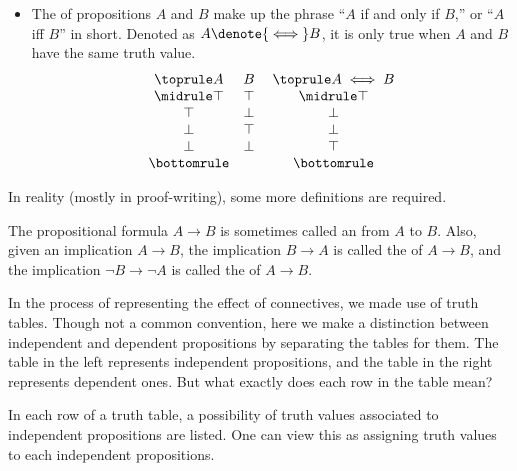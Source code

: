 \begin{itemize}
    \item The  of propositions \(A\) and \(B\)
    make up the phrase ``\(A\) if and only if \(B\),''
    or ``\(A\) iff \(B\)'' in short.
    Denoted as \(A\denote{\iff}B\),
    it is only true when \(A\) and \(B\) have the same truth value.
    \[
        \begin{array}{c c} \toprule
            A & B \\ \midrule
            \top & \top \\
            \top & \bot \\
            \bot & \top \\
            \bot & \bot \\ \bottomrule            
        \end{array}
        \;
        \begin{array}{c} \toprule
            A\iff B \\ \midrule
            \top \\
            \bot \\
            \bot \\
            \top \\ \bottomrule            
        \end{array}
    \]
\end{itemize}

In reality (mostly in proof-writing),
some more definitions are required.

\begin{definition}[Conditionals]
    \label{def:conditional}
    The propositional formula \(A\to B\)
    is sometimes called an  from \(A\) to \(B\).
    Also, given an implication \(A\to B\),
    the implication \(B\to A\) is called
    the  of \(A\to B\),
    and the implication \(\neg B\to\neg A\) is called
    the  of \(A\to B\).
\end{definition}

In the process of representing the effect of connectives,
we made use of truth tables.
Though not a common convention,
here we make a distinction between
independent and dependent propositions
by separating the tables for them.
The table in the left represents independent propositions,
and the table in the right represents dependent ones.
But what exactly does each row in the table mean?

In each row of a truth table,
a possibility of truth values associated to independent propositions
are listed.
One can view this as assigning truth values
to each independent propositions.

